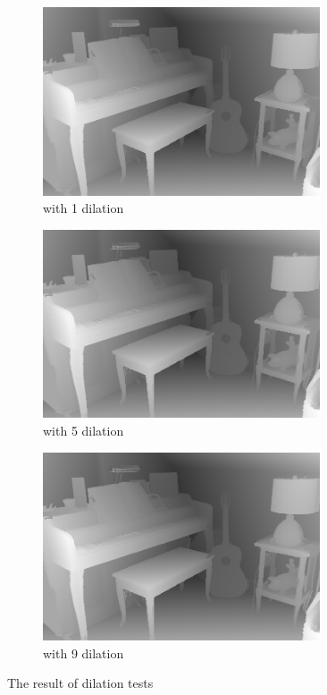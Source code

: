 \documentclass{article}
\begin{document}
\begin{CJK*}{UTF8}{bkai}
\begin{figure}[h]
\centering
    \begin{subfigure}{.3\textwidth}
        \centering
        \includegraphics[width=0.9\textwidth]{results/dliate_1.png}
        \caption{with 1 dilation}
    \end{subfigure}
    \begin{subfigure}{.3\textwidth}
        \centering
        \includegraphics[width=0.9\textwidth]{results/dliate_5.png}
        \caption{with 5 dilation}
    \end{subfigure}
    \begin{subfigure}{.3\textwidth}
        \centering
        \includegraphics[width=0.9\textwidth]{results/dliate_9.png}
        \caption{with 9 dilation}
    \end{subfigure}
    \caption{The result of dilation tests}
    \label{fig:result_of_dilation_test}
\end{figure}


\end{CJK*}
\end{document}
